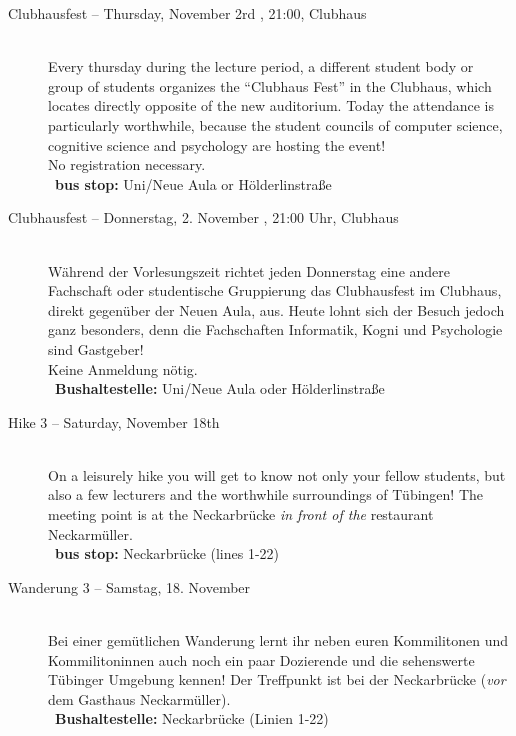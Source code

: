 \begin{description}
\ifml
    \item[Clubhausfest -- Thursday, November 2rd \YEAR, 21:00, Clubhaus]\ \\
	Every thursday during the lecture period, a different student body or group of students organizes the "`Clubhaus Fest"' in
	the Clubhaus, which locates directly opposite of the new auditorium. Today the attendance is particularly worthwhile, because
	the student councils of computer science, cognitive science and psychology are hosting the event! \\
	No registration necessary.\\
	~\textbf{bus stop:} Uni/Neue Aula or Hölderlinstraße
\else
    \item[Clubhausfest -- Donnerstag, 2. November \YEAR, 21:00 Uhr, Clubhaus]\ \\
	Während der Vorlesungszeit richtet jeden Donnerstag eine andere Fachschaft oder studentische Gruppierung das Clubhausfest
	im Clubhaus, direkt gegenüber der Neuen Aula, aus. Heute lohnt sich der Besuch jedoch ganz besonders, denn die Fachschaften
	Informatik, Kogni und Psychologie sind Gastgeber! \\
	Keine Anmeldung nötig.\\
	~\textbf{Bushaltestelle:} Uni/Neue Aula oder Hölderlinstraße
\fi

\ifmaster \iflehramt \pagebreak  \fi \fi

\ifml
	\item[Hike 3 -- Saturday, November 18th \YEAR]~\\%
	On a leisurely hike you will get to know not only your fellow students,
	but also a few lecturers and the worthwhile surroundings of Tübingen!
	The meeting point is at the Neckarbrücke \emph{in front of the} restaurant \glqq Neckarmüller\grqq. \\
	~\textbf{bus stop:} Neckarbrücke (lines 1-22)
\else
	\item[Wanderung 3 -- Samstag, 18. November \YEAR]~\\%
	Bei einer gemütlichen Wanderung lernt ihr neben euren Kommilitonen und Kommilitoninnen auch
	noch ein paar Dozierende und die sehenswerte Tübinger Umgebung kennen!
	Der Treffpunkt ist bei der Neckarbrücke (\emph{vor} dem Gasthaus \glqq Neckarmüller\grqq).\\
	~\textbf{Bushaltestelle:} Neckarbrücke (Linien 1-22)
\fi


\end{description}
